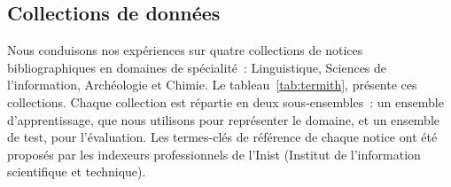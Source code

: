   \subsection{Collections de données}
  \label{subsec:main-domain_specific_keyphrase_annotation-supervised_automatic_keyphrase_annotation-evaluation-evaluation_data}
    Nous conduisons nos expériences sur quatre collections de notices
    bibliographiques en domaines de spécialité~: Linguistique, Sciences de
    l'information, Archéologie et Chimie. Le tableau~\ref{tab:termith},
    présente ces collections. Chaque collection est répartie en deux
    sous-ensembles~: un ensemble d'apprentissage, que nous utilisons pour
    représenter le domaine, et un ensemble de test, pour l'évaluation. Les
    termes-clés de référence de chaque notice ont été proposés par les indexeurs
    professionnels de l'Inist (Institut de l’information scientifique et
    technique).
    \begin{table}[!h]
      \centering

      \caption{Collections de données
               \label{tab:termith}}
    \end{table}

